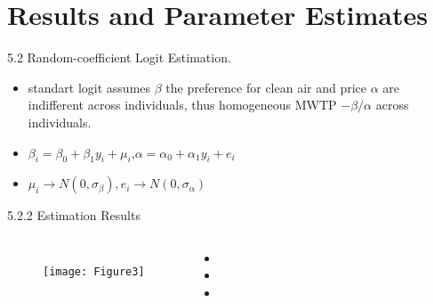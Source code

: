 \documentclass[10pt]{beamer}
\begin{document}
\section{Results and Parameter Estimates}

\begin{frame}[fragile]{5.2 Random-coefficient Logit Estimation.}
      \begin{itemize}
          \item     standart logit assumes $\beta$ the preference for clean air and price $\alpha$ are indifferent across individuals, thus homogeneous MWTP $-\beta/\alpha$ across individuals.
          \item $\beta_i = \beta_0+\beta_1 y_i +\mu_i$,$\alpha = \alpha_0 +\alpha_{1}y_i+e_i$
          \item $\mu_i\rightarrow N(0,\sigma_\beta),e_i\rightarrow N(0,\sigma_\alpha)$
      \end{itemize}
\end{frame}


\begin{frame}{5.2.2 Estimation Results}
    \begin{columns}[c] 
    \column{9cm}
    \begin{figure}
        \centering
        \texttt{[image: Figure3]}
    \end{figure}
    \column{4cm}
    \begin{itemize}
        \item 
        \item 
        \item 
    \end{itemize}
	\end{columns}
\end{frame}
\end{document}
